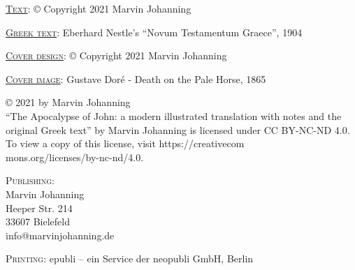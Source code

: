 \thispagestyle{empty}
\noindent\textsc{\underline{Text}}: © Copyright 2021 Marvin Johanning

\noindent\textsc{\underline{Greek text}}: Eberhard Nestle's ``Novum Testamentum Graece'', 1904

\noindent\textsc{\underline{Cover design}}: © Copyright 2021 Marvin Johanning

\noindent\textsc{\underline{Cover image}}: Gustave Doré - Death on the Pale Horse, 1865

\bigskip

\noindent© 2021 by Marvin Johanning\\``The Apocalypse of John: a modern illustrated translation with notes and the original Greek text'' by Marvin Johanning is licensed under CC BY-NC-ND 4.0. To view a copy of this license, visit https://creativecom\\mons.org/licenses/by-nc-nd/4.0.

\vspace{10mm}\noindent\textsc{Publishing}: \\
Marvin Johanning\\
Heeper Str.  214\\
33607 Bielefeld\\
info@marvinjohanning.de

\vspace{5mm}\noindent\textsc{Printing}: epubli – ein Service der neopubli GmbH, Berlin
\newpage
